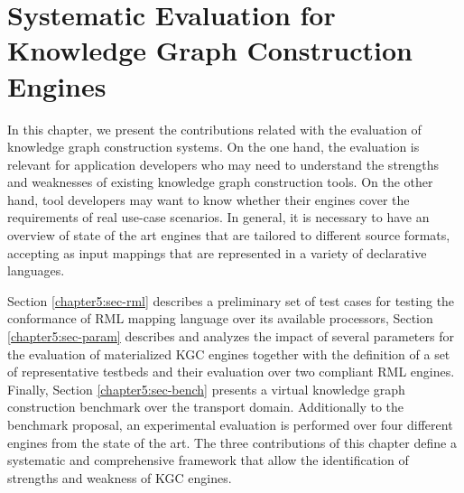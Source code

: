 \chapter{Systematic Evaluation for Knowledge Graph Construction Engines}
\label{chapter:evaluation}
In this chapter, we present the contributions related with the evaluation of knowledge graph construction systems. On the one hand, the evaluation is relevant for application developers who may need to understand the strengths and weaknesses of existing knowledge graph construction tools. On the other hand, tool developers may want to know whether their engines cover the requirements of real use-case scenarios. In general, it is necessary to have an overview of state of the art engines that are tailored to different source formats, accepting as input mappings that are represented in a variety of declarative languages. 

 Section \ref{chapter5:sec-rml} describes a preliminary set of test cases for testing the conformance of RML mapping language over its available processors, Section \ref{chapter5:sec-param} describes and analyzes the impact of several parameters for the evaluation of materialized KGC engines together with the definition of a set of representative testbeds and their evaluation over two compliant RML engines. Finally, Section \ref{chapter5:sec-bench} presents a virtual knowledge graph construction benchmark over the transport domain. Additionally to the benchmark proposal, an experimental evaluation is performed over four different engines from the state of the art. The three contributions of this chapter define a systematic and comprehensive framework that allow the identification of strengths and weakness of KGC engines.









